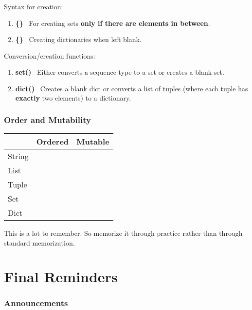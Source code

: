 \documentclass[xcolor=table]{beamer}
\begin{document}
%
%
\begin{frame}[fragile]
  \frametitle{}
  Syntax for creation:
  \begin{enumerate}
    \item \textbf{\{\}} \textrightarrow \ For creating sets \textbf{only if there are elements in between}.
    \item \textbf{\{\}} \textrightarrow \ Creating dictionaries when left blank.
  \end{enumerate}
  \vfill
  Conversion/creation functions:
  \begin{enumerate}
    \item \textbf{set()} \textrightarrow \ Either converts a sequence type to a set or creates a blank set.
    \item \textbf{dict()} \ Creates a blank dict or converts a list of tuples (where each tuple has \textbf{exactly} two elements) to a dictionary.
  \end{enumerate}
\end{frame}


%
%
\begin{frame}[fragile]
  \frametitle{Order and Mutability}
  \begin{table}[]
    \begin{tabular}{l|l|l}
      \hline
      \multicolumn{1}{c|}{}       & \multicolumn{1}{c|}{Ordered}                  & \multicolumn{1}{c}{Mutable}                  \\ \hline
      \multicolumn{1}{c|}{String} & \multicolumn{1}{c|}{\cellcolor[HTML]{34FF34}} & \multicolumn{1}{c}{\cellcolor[HTML]{FE0000}} \\ \hline
      List                        & \cellcolor[HTML]{34FF34}                      & \cellcolor[HTML]{34FF34}                     \\ \hline
      Tuple                       & \cellcolor[HTML]{34FF34}                      & \cellcolor[HTML]{FE0000}                     \\ \hline
      Set                         & \cellcolor[HTML]{FE0000}                      & \cellcolor[HTML]{34FF34}                     \\ \hline
      Dict                        & \cellcolor[HTML]{FE0000}                      & \cellcolor[HTML]{34FF34}                     \\ \hline
    \end{tabular}
  \end{table}
  \pause
  This is a lot to remember. So memorize it through practice rather than through standard memorization. 
\end{frame}



\section{Final Reminders}

\begin{frame}
  \frametitle{Announcements}
\end{frame}
\end{document}
